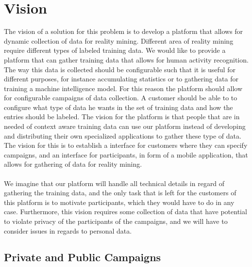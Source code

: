 \section{Vision}
\label{sec:vision}
The vision of a solution for this problem is to develop a platform that allows for dynamic collection of data for reality mining. Different area of reality mining require different types of labeled training data. We would like to provide a platform that can gather training data that allows for human activity recognition. The way this data is collected should be configurable such that it is useful for different purposes, for instance accumulating statistics or to gathering data for training a machine intelligence model. For this reason the platform should allow for configurable campaigns of data collection. A customer should be able to to configure what type of data he wants in the set of training data and how the entries should be labeled. The vision for the platform is that people that are in needed of context aware training data can use our platform instead of developing and distributing their own specialized applications to gather these type of data. The vision for this is to establish a interface for customers where they can specify campaigns, and an interface for participants, in form of a mobile application, that allows for gathering of data for reality mining.
\\\\
We imagine that our platform will handle all technical details in regard of gathering the training data, and the only task that is left for the customers of this platform is to motivate participants, which they would have to do in any case. Furthermore, this vision requires some collection of data that have potential to violate privacy of the participants of the campaigns, and we will have to consider issues in regards to personal data.

\subsection{Private and Public Campaigns}
\label{sub:private_and_public_campaigns}

